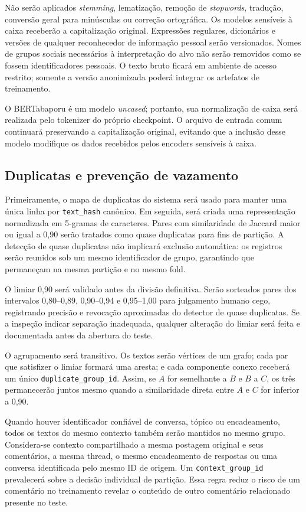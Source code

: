 Não serão aplicados \textit{stemming}, lematização, remoção de \textit{stopwords},
tradução, conversão geral para minúsculas ou correção ortográfica. Os modelos
sensíveis à caixa receberão a capitalização original. Expressões regulares,
dicionários e versões de qualquer reconhecedor de informação pessoal serão
versionados. Nomes de grupos sociais necessários à interpretação do alvo não
serão removidos como se fossem identificadores pessoais. O texto bruto ficará
em ambiente de acesso restrito; somente a versão anonimizada poderá integrar os
artefatos de treinamento.

O BERTabaporu é um modelo \textit{uncased}; portanto, sua normalização de caixa
será realizada pelo tokenizer do próprio checkpoint. O arquivo de entrada comum
continuará preservando a capitalização original, evitando que a inclusão desse
modelo modifique os dados recebidos pelos encoders sensíveis à caixa.

\subsection{Duplicatas e prevenção de vazamento}

Primeiramente, o mapa de duplicatas do sistema será usado para manter uma única
linha por \texttt{text\_hash} canônico. Em seguida, será criada uma representação
normalizada em 5-gramas de caracteres. Pares com similaridade de Jaccard maior
ou igual a 0,90 serão tratados como quase duplicatas para fins de partição. A
detecção de quase duplicatas não implicará exclusão automática: os registros
serão reunidos sob um mesmo identificador de grupo, garantindo que permaneçam
na mesma partição e no mesmo fold.

O limiar 0,90 será validado antes da divisão definitiva. Serão sorteados pares
dos intervalos 0,80--0,89, 0,90--0,94 e 0,95--1,00 para julgamento humano cego,
registrando precisão e revocação aproximadas do detector de quase duplicatas.
Se a inspeção indicar separação inadequada, qualquer alteração do limiar será
feita e documentada antes da abertura do teste.

O agrupamento será transitivo. Os textos serão vértices de um grafo; cada par
que satisfizer o limiar formará uma aresta; e cada componente conexo receberá
um único \texttt{duplicate\_group\_id}. Assim, se $A$ for semelhante a $B$ e
$B$ a $C$, os três permanecerão juntos mesmo quando a similaridade direta entre
$A$ e $C$ for inferior a 0,90.

Quando houver identificador confiável de conversa, tópico ou encadeamento, todos
os textos do mesmo contexto também serão mantidos no mesmo grupo. Considera-se
contexto compartilhado a mesma postagem original e seus comentários, a mesma
thread, o mesmo encadeamento de respostas ou uma conversa identificada pelo
mesmo ID de origem. Um \texttt{context\_group\_id} prevalecerá sobre a decisão
individual de partição. Essa regra reduz o risco de um comentário no treinamento
revelar o conteúdo de outro comentário relacionado presente no teste.

